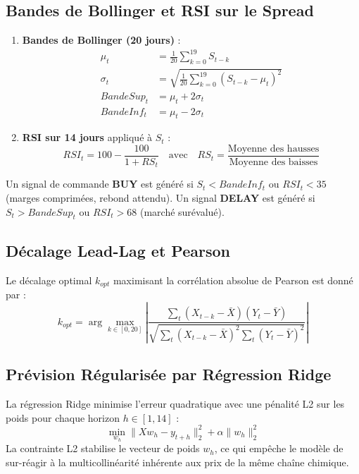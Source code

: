 \documentclass[12pt,a4paper]{article}
\begin{document}
\subsection{Bandes de Bollinger et RSI sur le Spread}
\begin{enumerate}
    \item \textbf{Bandes de Bollinger (20 jours)} :
    \begin{align}
    \mu_t &= \frac{1}{20} \sum_{k=0}^{19} S_{t-k} \\
    \sigma_t &= \sqrt{\frac{1}{20} \sum_{k=0}^{19} (S_{t-k} - \mu_t)^2} \\
    BandeSup_t &= \mu_t + 2\sigma_t \\
    BandeInf_t &= \mu_t - 2\sigma_t
    \end{align}
    \item \textbf{RSI sur 14 jours} appliqué à $S_t$ :
    \begin{equation}
    RSI_t = 100 - \frac{100}{1 + RS_t} \quad \text{avec} \quad RS_t = \frac{\text{Moyenne des hausses}}{\text{Moyenne des baisses}}
    \end{equation}
\end{enumerate}
Un signal de commande \textbf{BUY} est généré si $S_t < BandeInf_t$ ou $RSI_t < 35$ (marges comprimées, rebond attendu). Un signal \textbf{DELAY} est généré si $S_t > BandeSup_t$ ou $RSI_t > 68$ (marché surévalué).

\subsection{Décalage Lead-Lag et Pearson}
Le décalage optimal $k_{opt}$ maximisant la corrélation absolue de Pearson est donné par :
\begin{equation}
k_{opt} = \arg\max_{k \in [0, 20]} \left| \frac{\sum_{t} (X_{t-k} - \bar{X})(Y_t - \bar{Y})}{\sqrt{\sum_t (X_{t-k} - \bar{X})^2 \sum_t (Y_t - \bar{Y})^2}} \right|
\end{equation}

\subsection{Prévision Régularisée par Régression Ridge}
La régression Ridge minimise l'erreur quadratique avec une pénalité L2 sur les poids pour chaque horizon $h \in [1, 14]$ :
\begin{equation}
\min_{w_h} \| X w_h - y_{t+h} \|_2^2 + \alpha \| w_h \|_2^2
\end{equation}
La contrainte L2 stabilise le vecteur de poids $w_h$, ce qui empêche le modèle de sur-réagir à la multicollinéarité inhérente aux prix de la même chaîne chimique.
\end{document}
